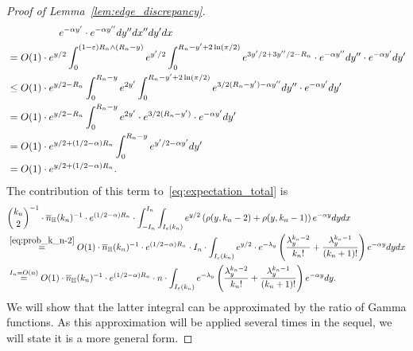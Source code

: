 \begin{proof}[Proof of Lemma~\ref{lem:edge_discrepancy}]
\begin{equation*}
\begin{split}
& \hspace{1.8cm} e^{-\alpha y'} \cdot e^{-\alpha y''} dy'' dx''dy' dx \\
&=O(1) \cdot e^{y/2}  \int_0^{(1-\varepsilon) R_n \wedge (R_n - y)} e^{y'/2} 
\int_0^{ R_n-y'+2\ln (\pi/2)} e^{3y'/2 + 3y''/2 - R_n}\cdot e^{-\alpha y''} dy''  \cdot e^{-\alpha y'} dy' \\
&\leq O(1) \cdot e^{y/2-R_n} \int_0^{R_n - y} e^{2y'} 
\int_0^{ R_n-y'+2\ln (\pi/2)} e^{3/2 (R_n-y') -\alpha y''}dy''  \cdot e^{-\alpha y'} dy' \\
&=O(1) \cdot e^{y/2 -R_n} \int_0^{R_n - y} e^{2y'} \cdot 
e^{3/2(R_n - y')}  \cdot e^{-\alpha y'} dy' \\
&=O(1) \cdot e^{y/2 + (1/2 -\alpha)R_n}  
\int_0^{R_n - y} e^{y'/2 - \alpha y'} dy' \\
&=O(1) \cdot e^{y/2 + (1/2 -\alpha)R_n}.
\end{split}
\end{equation*}
The contribution of this term to~\eqref{eq:expectation_total} is 
\begin{equation*} 
\begin{split}
&{k_n \choose 2}^{-1} \cdot \overline{n}_{\mathbb{H}}(k_n)^{-1} \cdot 
e^{(1/2 - \alpha)R_n} \cdot \int_{-I_n}^{I_n} \int_{I_{\varepsilon} (k_n)} e^{y/2}
\left( \rho(y,k_n-2) + \rho(y,k_n-1) \right) e^{-\alpha y} dy dx \\  
&\stackrel{\eqref{eq:prob_k_n-2}}{=} O(1) \cdot \overline{n}_{\mathbb{H}}(k_n)^{-1} \cdot 
e^{(1/2 - \alpha)R_n}\cdot I_n \cdot  \int_{I_\varepsilon (k_n)} 
e^{y/2} \cdot e^{-\lambda_y} \left(
\frac{\lambda_y^{k_n-2}}{k_n!}+\frac{\lambda_y^{k_n-1}}{(k_n+1)!} \right) e^{-\alpha y} dy dx \\ 
&\stackrel{I_n = O(n)}{=}  O(1) \cdot \overline{n}_{\mathbb{H}}(k_n)^{-1} \cdot 
e^{(1/2 - \alpha)R_n} \cdot n \cdot
\int_{I_\varepsilon(k_n)} e^{-\lambda_y} 
\left(\frac{\lambda_y^{k_n-2}}{k_n!}
+\frac{\lambda_y^{k_n-1}}{(k_n+1)!} \right)  e^{-\alpha y}dy. 
\end{split}
\end{equation*}
We will show that the latter integral can be approximated by the ratio of Gamma functions. 
As this approximation will be applied several times in the sequel, we will state it is a more 
general form.  


\end{proof}
